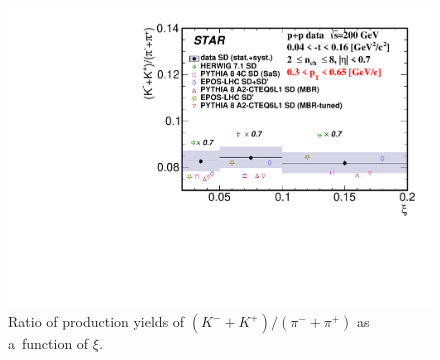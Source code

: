 \begin{figure}[b!]
	\centering
	\includegraphics[width=.99\textwidth,page=1]{chapters/chrgSTAR/img/results/outPID_Kpi_ratio_xi.pdf}
	\caption{Ratio of production yields of $\left(K^-+K^+\right)/\left(\pi^-+\pi^+\right)$ as a~function of $\xi$. }
	\label{fig:results_Kpi_xi}
	
\end{figure}

\FloatBarrier